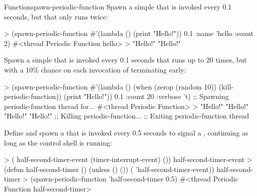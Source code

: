 \begin{functiondoc}{Function}{spawn-periodic-function}
\fnexamples 
Spawn a simple  that is invoked every 0.1 seconds,
but that only runs twice:
%
\W\supp
\begin{example}
> (spawn-periodic-function #'(lambda () (print "Hello!")) 0.1 
    :name 'hello
    :count 2)
#<thread Periodic Function hello>
>
"Hello!" 
"Hello!" 
\end{example}
%
%
%
Spawn a simple  that is invoked every 0.1 seconds
that runs up to 20 times, but with a 10\% chance on each invocation of
terminating early:
%
\W\supp\notpretop
\begin{example}
> (spawn-periodic-function 
     #'(lambda ()
         (when (zerop (random 10))
           (kill-periodic-function))
         (print "Hello!")) 
     0.1
     :count 20
     :verbose 't)
;; Spawning periodic-function thread for...
#<thread Periodic Function>
>
"Hello!" 
"Hello!" 
"Hello!" 
"Hello!" 
;; Killing periodic-function...
;; Exiting periodic-function thread
\end{example}
%
%
%
%
%
%
Define and spawn a  that is invoked every 0.5 seconds
to signal a , continuing as long as the
control shell is running:
%
\W\supp\notpretop
\begin{example}
> ( half-second-timer-event (timer-interrupt-event)
    ())
half-second-timer-event
> (defun half-second-timer ()
    (unless ()
      ())
    ( 'half-second-timer-event))
half-second-timer
> (spawn-periodic-function 'half-second-timer 0.5)
#<thread Periodic Function half-second-timer>
\end{example}

\end{functiondoc}


